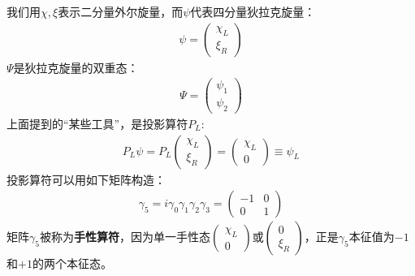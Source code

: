 我们用$\chi, \xi$表示二分量外尔旋量，而$\psi$代表四分量狄拉克旋量：
\begin{align}
\psi=\begin{pmatrix}\chi_L\\\xi_R\end{pmatrix}
\label{equ7.98}
\end{align}
$\Psi$是狄拉克旋量的双重态：
\begin{align}
\Psi=\begin{pmatrix}\psi_1\\\psi_2\end{pmatrix}
\label{equ7.99}
\end{align}
上面提到的“某些工具”，是投影算符$P_L$:
\begin{align}
P_L\psi=P_L\begin{pmatrix}\chi_L\\\xi_R\end{pmatrix}=\begin{pmatrix}\chi_L\\0\end{pmatrix}\equiv \psi_L
\label{equ7.100}
\end{align}
投影算符可以用如下矩阵构造：
\begin{align}
\gamma_5=i\gamma_0\gamma_1\gamma_2\gamma_3=\begin{pmatrix}-1 & 0 \\ 0 & 1\end{pmatrix}
\label{equ7.101}
\end{align}
矩阵$\gamma_5$被称为{\bfseries 手性算符}，因为单一手性态$\begin{pmatrix}\chi_L\\0\end{pmatrix}$或$\begin{pmatrix}0\\\xi_R\end{pmatrix}$，正是$\gamma_5$本征值为$-1$和$+1$的两个本征态。

